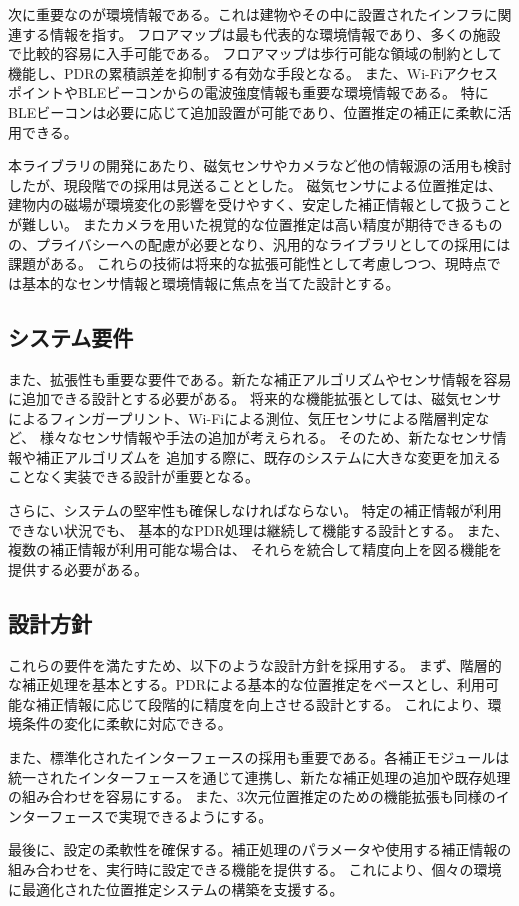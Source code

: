 次に重要なのが環境情報である。これは建物やその中に設置されたインフラに関連する情報を指す。
フロアマップは最も代表的な環境情報であり、多くの施設で比較的容易に入手可能である。
フロアマップは歩行可能な領域の制約として機能し、PDRの累積誤差を抑制する有効な手段となる。
また、Wi-FiアクセスポイントやBLEビーコンからの電波強度情報も重要な環境情報である。
特にBLEビーコンは必要に応じて追加設置が可能であり、位置推定の補正に柔軟に活用できる。

本ライブラリの開発にあたり、磁気センサやカメラなど他の情報源の活用も検討したが、現段階での採用は見送ることとした。
磁気センサによる位置推定は、建物内の磁場が環境変化の影響を受けやすく、安定した補正情報として扱うことが難しい。
またカメラを用いた視覚的な位置推定は高い精度が期待できるものの、プライバシーへの配慮が必要となり、汎用的なライブラリとしての採用には課題がある。
これらの技術は将来的な拡張可能性として考慮しつつ、現時点では基本的なセンサ情報と環境情報に焦点を当てた設計とする。

\subsection{システム要件}

また、拡張性も重要な要件である。新たな補正アルゴリズムやセンサ情報を容易に追加できる設計とする必要がある。
将来的な機能拡張としては、磁気センサによるフィンガープリント、Wi-Fiによる測位、気圧センサによる階層判定など、
様々なセンサ情報や手法の追加が考えられる。
そのため、新たなセンサ情報や補正アルゴリズムを
追加する際に、既存のシステムに大きな変更を加えることなく実装できる設計が重要となる。

さらに、システムの堅牢性も確保しなければならない。
特定の補正情報が利用できない状況でも、
基本的なPDR処理は継続して機能する設計とする。
また、複数の補正情報が利用可能な場合は、
それらを統合して精度向上を図る機能を提供する必要がある。

\subsection{設計方針}

これらの要件を満たすため、以下のような設計方針を採用する。
まず、階層的な補正処理を基本とする。PDRによる基本的な位置推定をベースとし、利用可能な補正情報に応じて段階的に精度を向上させる設計とする。
これにより、環境条件の変化に柔軟に対応できる。

また、標準化されたインターフェースの採用も重要である。各補正モジュールは統一されたインターフェースを通じて連携し、新たな補正処理の追加や既存処理の組み合わせを容易にする。
また、3次元位置推定のための機能拡張も同様のインターフェースで実現できるようにする。

最後に、設定の柔軟性を確保する。補正処理のパラメータや使用する補正情報の組み合わせを、実行時に設定できる機能を提供する。
これにより、個々の環境に最適化された位置推定システムの構築を支援する。

